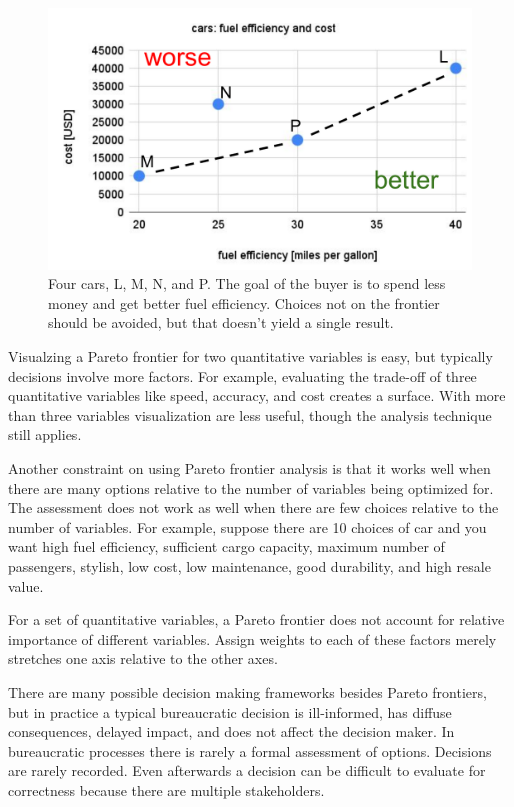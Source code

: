 \begin{figure}[ht]
    \centering
    \includegraphics[width=1\textwidth]{images/pareto_frontier_car_options.pdf}
    \caption{Four cars, L, M, N, and P. The goal of the buyer is to spend less money and get better fuel efficiency. Choices not on the frontier should be avoided, but that doesn't yield a single result.}
    \label{fig:pareto_frontier_cars}
\end{figure}

Visualzing a Pareto frontier for two quantitative variables is easy, but typically decisions involve more factors. For example, evaluating the trade-off of three quantitative variables like speed, accuracy, and cost creates a surface. With more than three variables visualization are less useful, though the analysis technique still applies. 

Another constraint on using Pareto frontier analysis is that it works well when there are many options relative to the number of variables being optimized for. 
The assessment does not work as well when there are few choices relative to the number of variables. For example, suppose there are 10 choices of car and you want high fuel efficiency, sufficient cargo capacity, maximum number of passengers, stylish, low cost, low maintenance, good durability, and high resale value. 

For a set of quantitative variables, a Pareto frontier does not account for relative importance of different variables. Assign weights to each of these factors merely stretches one axis relative to the other axes. 

There are many possible decision making frameworks besides Pareto frontiers, but in practice a typical bureaucratic decision is ill-informed, has diffuse consequences, delayed impact, and does not affect the decision maker. In bureaucratic processes there is rarely a formal assessment of options. 
Decisions are rarely recorded. 
Even afterwards a decision can be difficult to evaluate for correctness because there are multiple stakeholders.


